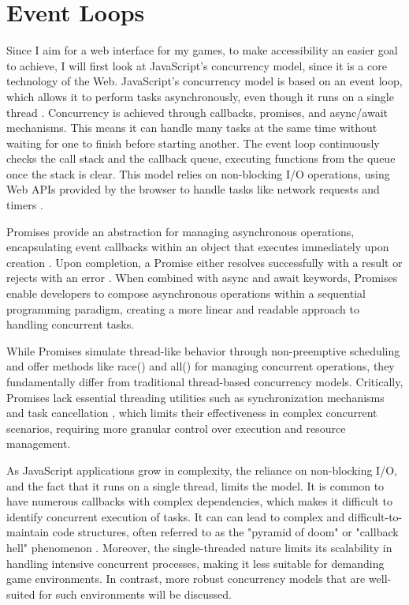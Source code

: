 \documentclass[]{final}
\begin{document}
\section{Event Loops}
Since I aim for a web interface for my games, to make
accessibility an easier goal to achieve, I will first look at JavaScript's
concurrency model, since it is a core technology of the Web.
JavaScript's concurrency model is based on an event loop, which allows it to
perform tasks asynchronously, even though it runs on a single thread \cite{zhao_concurrency_2021}.
Concurrency is achieved through callbacks, promises, and
async/await mechanisms. This means it can handle many tasks at the same time without waiting for one
to finish before starting another. The event loop continuously checks the call
stack and the callback queue, executing functions from the queue once
the stack is clear. This model relies on non-blocking I/O operations,
using Web APIs provided by the browser to handle tasks like network
requests and timers \cite{noauthor_event_2024}.

Promises provide an abstraction for managing asynchronous operations,
encapsulating event callbacks within an object that executes
immediately upon creation \cite{zhao_concurrency_2021}.
Upon completion, a Promise either
resolves successfully with a result or rejects with an error
\cite{zhao_concurrency_2021}. When combined with async and await
keywords, Promises enable
developers to compose asynchronous operations within a
sequential programming paradigm, creating a more linear and
readable approach to handling concurrent tasks.

While Promises simulate thread-like behavior through non-preemptive scheduling
and offer methods like race() and all() for managing concurrent operations,
\cite{noauthor_event_2024} they fundamentally differ from traditional thread-based
concurrency models.
Critically, Promises lack essential threading utilities such as synchronization
mechanisms and task cancellation \cite{zhao_concurrency_2021}, which limits their effectiveness in
complex concurrent scenarios, requiring more granular control over execution
and resource management.

As JavaScript applications grow in complexity, the reliance on non-blocking
I/O, and the fact that it runs on a single thread,
limits the model. It
is common to have numerous callbacks with complex dependencies,
which makes it difficult to identify concurrent
execution of tasks.
It can can lead to complex and difficult-to-maintain code structures, often
referred to as the "pyramid of doom" or "callback hell" phenomenon \cite{belson_survey_2019, noauthor_callback_nodate}.
Moreover, the single-threaded nature limits its scalability in handling
intensive concurrent processes, making it less suitable for demanding game environments.
In contrast, more robust concurrency models that are well-suited for
such environments will be discussed.
\end{document}
